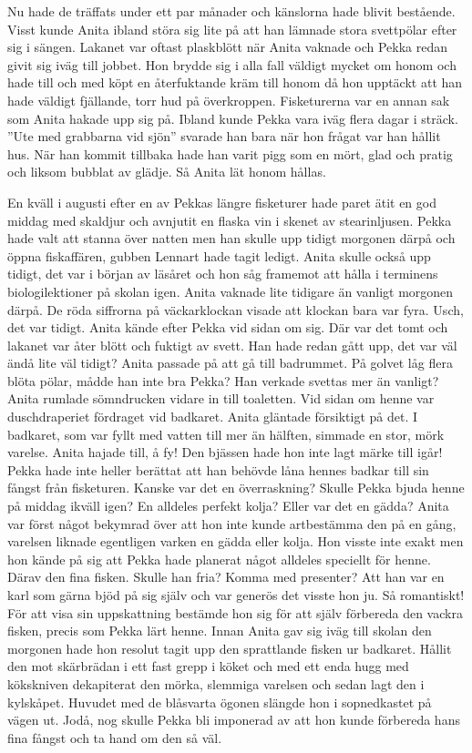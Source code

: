 Nu hade de träffats under ett par månader och känslorna hade blivit bestående. Visst kunde Anita ibland störa sig lite på att han lämnade stora svettpölar efter sig i sängen. Lakanet var oftast plaskblött när Anita vaknade och Pekka redan givit sig iväg till jobbet. Hon brydde sig i alla fall väldigt mycket om honom och hade till och med köpt en återfuktande kräm till honom då hon upptäckt att han hade väldigt fjällande, torr hud på överkroppen.  Fisketurerna var en annan sak som Anita hakade upp sig på. Ibland kunde Pekka vara iväg flera dagar i sträck. ”Ute med grabbarna vid sjön” svarade han bara när hon frågat var han hållit hus. När han kommit tillbaka hade han varit pigg som en mört, glad och pratig och liksom bubblat av glädje. Så Anita lät honom hållas. 

En kväll i augusti efter en av Pekkas längre fisketurer hade paret ätit en god middag med skaldjur och avnjutit en flaska vin i skenet av stearinljusen. Pekka hade valt att stanna över natten men han skulle upp tidigt morgonen därpå och öppna fiskaffären, gubben Lennart hade tagit ledigt. Anita skulle också upp tidigt, det var i början av läsåret och hon såg framemot att hålla i terminens biologilektioner på skolan igen. Anita vaknade lite tidigare än vanligt morgonen därpå. De röda siffrorna på väckarklockan visade att klockan bara var fyra. Usch, det var tidigt. Anita kände efter Pekka vid sidan om sig. Där var det tomt och lakanet var åter blött och fuktigt av svett. Han hade redan gått upp, det var väl ändå lite väl tidigt? Anita passade på att gå till badrummet. På golvet låg flera blöta pölar, mådde han inte bra Pekka? Han verkade svettas mer än vanligt? Anita rumlade sömndrucken vidare in till toaletten. Vid sidan om henne var duschdraperiet fördraget vid badkaret. Anita gläntade försiktigt på det. I badkaret, som var fyllt med vatten till mer än hälften, simmade en stor, mörk varelse. Anita hajade till, å fy! Den bjässen hade hon inte lagt märke till igår! Pekka hade inte heller berättat att han behövde låna hennes badkar till sin fångst från fisketuren. Kanske var det en överraskning? Skulle Pekka bjuda henne på middag ikväll igen? En alldeles perfekt kolja? Eller var det en gädda? Anita var först något bekymrad över att hon inte kunde artbestämma den på en gång, varelsen liknade egentligen varken en gädda eller kolja. Hon visste inte exakt men hon kände på sig att Pekka hade planerat något alldeles speciellt för henne. Därav den fina fisken. Skulle han fria? Komma med presenter? Att han var en karl som gärna bjöd på sig själv och var generös det visste hon ju. Så romantiskt! För att visa sin uppskattning bestämde hon sig för att själv förbereda den vackra fisken, precis som Pekka lärt henne. Innan Anita gav sig iväg till skolan den morgonen hade hon resolut tagit upp den sprattlande fisken ur badkaret. Hållit den mot skärbrädan i ett fast grepp i köket och med ett enda hugg med kökskniven dekapiterat den mörka, slemmiga varelsen och sedan lagt den i kylskåpet. Huvudet med de blåsvarta ögonen slängde hon i sopnedkastet på vägen ut. Jodå, nog skulle Pekka bli imponerad av att hon kunde förbereda hans fina fångst och ta hand om den så väl. 

